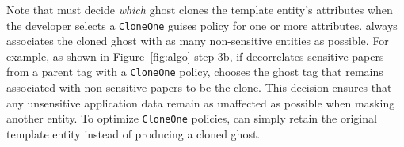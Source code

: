 Note that \sys must decide \emph{which} ghost clones the template entity's attributes when the
developer selects a \texttt{CloneOne} guises policy for one or more attributes. \sys always
associates the cloned ghost with as many non-sensitive entities as possible. For example, as shown
in Figure~\ref{fig:algo} step 3b, if \sys decorrelates sensitive papers from a parent tag with a
\texttt{CloneOne} policy, \sys chooses the ghost tag that remains associated with non-sensitive
papers to be the clone. This decision ensures that any unsensitive application
data remain as unaffected as possible when masking another entity.
To optimize
\texttt{CloneOne} policies, \sys can simply retain the original template entity instead of producing
a cloned ghost.


\fi
